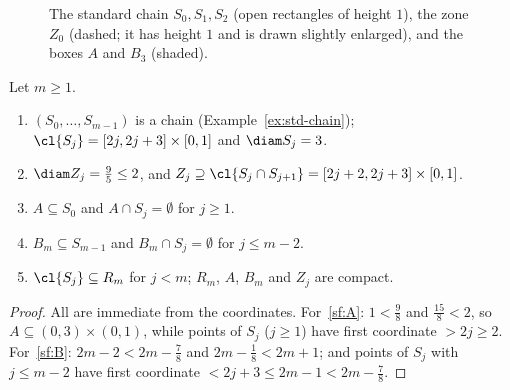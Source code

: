 \begin{figure}[ht]
\centering
{}
\caption{The standard chain $S_0,S_1,S_2$ (open rectangles of height $1$), the zone $Z_0$
(dashed; it has height $1$ and is drawn slightly enlarged), and the boxes $A$ and $B_3$ (shaded).}
\label{fig:std}
\end{figure}

\begin{lemma}\label{lem:std-facts}
Let $m\ge1$.
\begin{enumerate}[label=(\alph*)]
\item\label{sf:chain} $(S_0,\dots,S_{m-1})$ is a chain (Example~\ref{ex:std-chain}); $\cl{S_j}=
[2j,2j+3]\times[0,1]$ and $\diam S_j=3$.
\item\label{sf:zone} $\diam Z_j=\frac95\le2$, and $Z_j\supseteq\cl{S_j\cap S_{j+1}}=[2j+2,2j+3]\times
[0,1]$.
\item\label{sf:A} $A\subseteq S_0$ and $A\cap S_j=\emptyset$ for $j\ge1$.
\item\label{sf:B} $B_m\subseteq S_{m-1}$ and $B_m\cap S_j=\emptyset$ for $j\le m-2$.
\item\label{sf:R} $\cl{S_j}\subseteq R_m$ for $j<m$; $R_m$, $A$, $B_m$ and $Z_j$ are compact.
\end{enumerate}
\end{lemma}

\begin{proof}
All are immediate from the coordinates. For~\ref{sf:A}: $1<\frac98$ and $\frac{15}8<2$, so
$A\subseteq(0,3)\times(0,1)$, while points of $S_j$ ($j\ge1$) have first coordinate $>2j\ge2$.
For~\ref{sf:B}: $2m-2<2m-\frac78$ and $2m-\frac18<2m+1$; and points of $S_j$ with $j\le m-2$ have
first coordinate $<2j+3\le2m-1<2m-\frac78$.
\end{proof}

